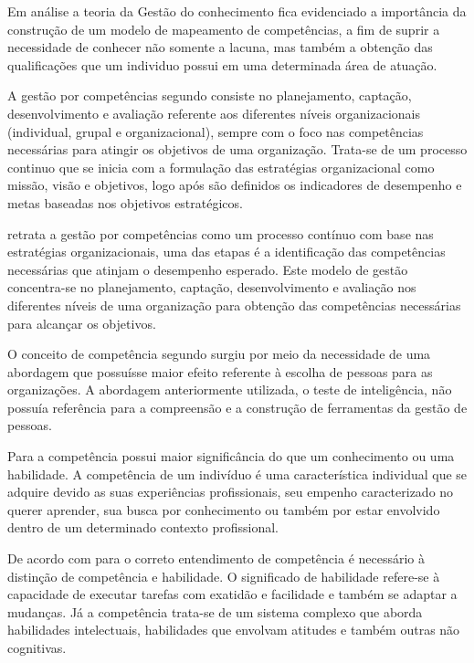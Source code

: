Em análise a teoria da Gestão do conhecimento fica evidenciado a importância da construção de um modelo de mapeamento de competências, a fim de suprir a necessidade de conhecer não somente a lacuna, mas também a obtenção das qualificações que um individuo possui em uma determinada área de atuação.

A gestão por competências segundo  consiste no planejamento, captação, desenvolvimento e avaliação referente aos diferentes níveis organizacionais (individual, grupal e organizacional), sempre com o foco nas competências necessárias para atingir os objetivos de uma organização. Trata-se de um processo continuo que se inicia com a formulação das estratégias organizacional como missão, visão e objetivos, logo após são definidos os indicadores de desempenho e metas baseadas nos objetivos estratégicos.

 retrata a gestão por competências como um processo contínuo com base nas estratégias organizacionais, uma das etapas é a identificação das competências necessárias que atinjam o desempenho esperado. Este modelo de gestão concentra-se no planejamento, captação, desenvolvimento e avaliação nos diferentes níveis de uma organização para obtenção das competências necessárias para alcançar os objetivos.

O conceito de competência segundo  surgiu por meio da necessidade de uma abordagem que possuísse maior efeito referente à escolha de pessoas para as organizações. A abordagem anteriormente utilizada, o teste de inteligência, não possuía referência para a compreensão e a construção de ferramentas da gestão de pessoas.

Para  a competência possui maior significância do que um conhecimento ou uma habilidade. A competência de um indivíduo é uma característica individual que se adquire devido as suas experiências profissionais, seu empenho caracterizado no querer aprender, sua busca por conhecimento ou também por estar envolvido dentro de um determinado contexto profissional.

De acordo com  para o correto entendimento de competência é necessário à distinção de competência e habilidade. O significado de habilidade refere-se à capacidade de executar tarefas com exatidão e facilidade e também se adaptar a mudanças. Já a competência trata-se de um sistema complexo que aborda habilidades intelectuais, habilidades que envolvam atitudes e também outras não cognitivas.

